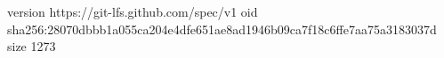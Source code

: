 version https://git-lfs.github.com/spec/v1
oid sha256:28070dbbb1a055ca204e4dfe651ae8ad1946b09ca7f18c6ffe7aa75a3183037d
size 1273
